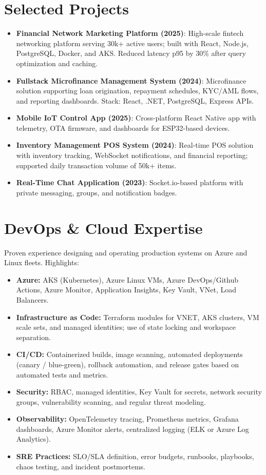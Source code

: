 \documentclass[letterpaper,11pt]{article}
\newcommand{\resumeItem}[2]{
  \item\small{
    \textbf{#1}{: #2 \vspace{-2pt}}
  }
}
\newcommand{\resumeSubItem}[2]{\resumeItem{#1}{#2}\vspace{-4pt}}
\newcommand{\resumeSubHeadingListStart}{\begin{itemize}[leftmargin=*]}
\newcommand{\resumeSubHeadingListEnd}{\end{itemize}}
\begin{document}
\section{Selected Projects}
  \resumeSubHeadingListStart
    \resumeSubItem{Financial Network Marketing Platform (2025)}
      {High-scale fintech networking platform serving 30k+ active users; built with React, Node.js, PostgreSQL, Docker, and AKS. Reduced latency p95 by 30\% after query optimization and caching.}
    \resumeSubItem{Fullstack Microfinance Management System (2024)}
      {Microfinance solution supporting loan origination, repayment schedules, KYC/AML flows, and reporting dashboards. Stack: React, .NET, PostgreSQL, Express APIs.}
    \resumeSubItem{Mobile IoT Control App (2025)}
      {Cross-platform React Native app with telemetry, OTA firmware, and dashboards for ESP32-based devices.}
    \resumeSubItem{Inventory Management POS System (2024)}
      {Real-time POS solution with inventory tracking, WebSocket notifications, and financial reporting; supported daily transaction volume of 50k+ items.}
    \resumeSubItem{Real-Time Chat Application (2023)}
      {Socket.io-based platform with private messaging, groups, and notification badges.}
  \resumeSubHeadingListEnd

\section{DevOps \& Cloud Expertise}
  \small{
    Proven experience designing and operating production systems on Azure and Linux fleets. Highlights:
  }
  \begin{itemize}[leftmargin=*]
    \item \textbf{Azure:} AKS (Kubernetes), Azure Linux VMs, Azure DevOps/Github Actions, Azure Monitor, Application Insights, Key Vault, VNet, Load Balancers.
    \item \textbf{Infrastructure as Code:} Terraform modules for VNET, AKS clusters, VM scale sets, and managed identities; use of state locking and workspace separation.
    \item \textbf{CI/CD:} Containerized builds, image scanning, automated deployments (canary / blue-green), rollback automation, and release gates based on automated tests and metrics.
    \item \textbf{Security:} RBAC, managed identities, Key Vault for secrets, network security groups, vulnerability scanning, and regular threat modeling.
    \item \textbf{Observability:} OpenTelemetry tracing, Prometheus metrics, Grafana dashboards, Azure Monitor alerts, centralized logging (ELK or Azure Log Analytics).
    \item \textbf{SRE Practices:} SLO/SLA definition, error budgets, runbooks, playbooks, chaos testing, and incident postmortems.
  \end{itemize}
\end{document}
